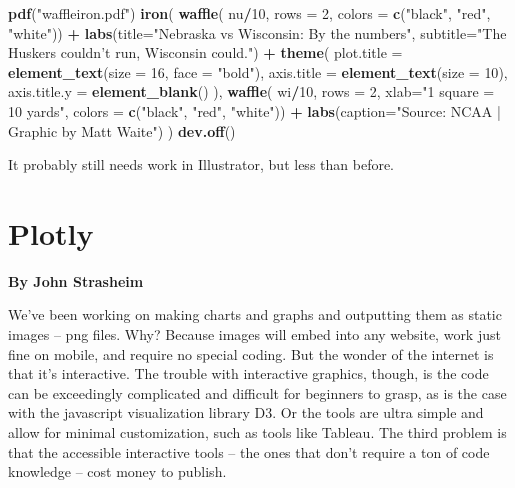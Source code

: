 \documentclass[]{book}
\newenvironment{Shaded}{\begin{snugshade}}{\end{snugshade}}
\newcommand{\DataTypeTok}[1]{\textcolor[rgb]{0.13,0.29,0.53}{#1}}
\newcommand{\DecValTok}[1]{\textcolor[rgb]{0.00,0.00,0.81}{#1}}
\newcommand{\KeywordTok}[1]{\textcolor[rgb]{0.13,0.29,0.53}{\textbf{#1}}}
\newcommand{\NormalTok}[1]{#1}
\newcommand{\OperatorTok}[1]{\textcolor[rgb]{0.81,0.36,0.00}{\textbf{#1}}}
\newcommand{\StringTok}[1]{\textcolor[rgb]{0.31,0.60,0.02}{#1}}
\begin{document}
\begin{Shaded}
\begin{Highlighting}[]
\KeywordTok{pdf}\NormalTok{(}\StringTok{"waffleiron.pdf"}\NormalTok{)}
\KeywordTok{iron}\NormalTok{(}
 \KeywordTok{waffle}\NormalTok{(}
\NormalTok{   nu}\OperatorTok{/}\DecValTok{10}\NormalTok{, }
   \DataTypeTok{rows =} \DecValTok{2}\NormalTok{, }
   \DataTypeTok{colors =} \KeywordTok{c}\NormalTok{(}\StringTok{"black"}\NormalTok{, }\StringTok{"red"}\NormalTok{, }\StringTok{"white"}\NormalTok{)) }\OperatorTok{+}\StringTok{ }
\StringTok{   }\KeywordTok{labs}\NormalTok{(}\DataTypeTok{title=}\StringTok{"Nebraska vs Wisconsin: By the numbers"}\NormalTok{, }\DataTypeTok{subtitle=}\StringTok{"The Huskers couldn't run, Wisconsin could."}\NormalTok{) }\OperatorTok{+}\StringTok{ }
\StringTok{   }\KeywordTok{theme}\NormalTok{(}
    \DataTypeTok{plot.title =} \KeywordTok{element_text}\NormalTok{(}\DataTypeTok{size =} \DecValTok{16}\NormalTok{, }\DataTypeTok{face =} \StringTok{"bold"}\NormalTok{),}
    \DataTypeTok{axis.title =} \KeywordTok{element_text}\NormalTok{(}\DataTypeTok{size =} \DecValTok{10}\NormalTok{),}
    \DataTypeTok{axis.title.y =} \KeywordTok{element_blank}\NormalTok{()}
\NormalTok{  ),}
 \KeywordTok{waffle}\NormalTok{(}
\NormalTok{   wi}\OperatorTok{/}\DecValTok{10}\NormalTok{, }
   \DataTypeTok{rows =} \DecValTok{2}\NormalTok{, }
   \DataTypeTok{xlab=}\StringTok{"1 square = 10 yards"}\NormalTok{, }
   \DataTypeTok{colors =} \KeywordTok{c}\NormalTok{(}\StringTok{"black"}\NormalTok{, }\StringTok{"red"}\NormalTok{, }\StringTok{"white"}\NormalTok{)) }\OperatorTok{+}\StringTok{ }\KeywordTok{labs}\NormalTok{(}\DataTypeTok{caption=}\StringTok{"Source: NCAA | Graphic by Matt Waite"}\NormalTok{)}
\NormalTok{) }
\KeywordTok{dev.off}\NormalTok{()}
\end{Highlighting}
\end{Shaded}

It probably still needs work in Illustrator, but less than before.

\hypertarget{plotly}{%
\chapter{Plotly}\label{plotly}}

\textbf{By John Strasheim}

We've been working on making charts and graphs and outputting them as static images -- png files. Why? Because images will embed into any website, work just fine on mobile, and require no special coding. But the wonder of the internet is that it's interactive. The trouble with interactive graphics, though, is the code can be exceedingly complicated and difficult for beginners to grasp, as is the case with the javascript visualization library D3. Or the tools are ultra simple and allow for minimal customization, such as tools like Tableau. The third problem is that the accessible interactive tools -- the ones that don't require a ton of code knowledge -- cost money to publish.
\end{document}
